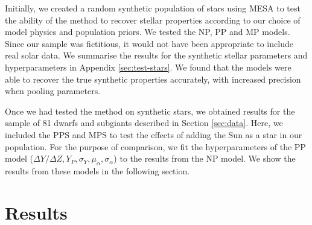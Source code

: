 \documentclass[a4paper,fleqn,usenatbib]{mnras}
\begin{document}
Initially, we created a random synthetic population of stars using MESA to test the ability of the method to recover stellar properties according to our choice of model physics and population priors. We tested the NP, PP and MP models. Since our sample was fictitious, it would not have been appropriate to include real solar data. We summarise the results for the synthetic stellar parameters and hyperparameters in Appendix \ref{sec:test-stars}. We found that the models were able to recover the true synthetic properties accurately, with increased precision when pooling parameters.

Once we had tested the method on synthetic stars, we obtained results for the sample of 81 dwarfs and subgiants described in Section \ref{sec:data}. Here, we included the PPS and MPS to test the effects of adding the Sun as a star in our population. For the purpose of comparison, we fit the hyperparameters of the PP model ($\Delta Y/\Delta Z, Y_P, \sigma_Y, \mu_\alpha, \sigma_\alpha$) to the results from the NP model. We show the results from these models in the following section.

\section{Results}\label{sec:res}



\end{document}
